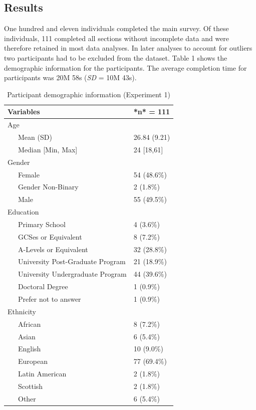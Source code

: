 \documentclass[
  donotrepeattitle,doc, 12pt, a4paper,floatsintext]{apa7}
\begin{document}
\hypertarget{results-1}{%
\subsection{Results}\label{results-1}}

One hundred and eleven individuals completed the main survey. Of these individuals, 111 completed all sections without incomplete data and were therefore retained in most data analyses. In later analyses to account for outliers two participants had to be excluded from the dataset. Table 1 shows the demographic information for the participants. The average completion time for participants was 20M 58s (\emph{SD} = 10M 43s).

\begin{table}[tbp]

\begin{center}
\begin{threeparttable}

\caption{\label{tab:unnamed-chunk-8}Participant demographic information (Experiment 1)}

\small{

\begin{tabular}{ll}
\toprule
Variables & *n* = 111\\
\midrule
Age & \\
\ \ \ Mean (SD) & 26.84 (9.21)\\
\ \ \ Median [Min, Max] & 24 [18,61]\\
Gender & \\
\ \ \ Female & 54 (48.6\%)\\
\ \ \ Gender Non-Binary & 2 (1.8\%)\\
\ \ \ Male & 55 (49.5\%)\\
Education & \\
\ \ \ Primary School & 4 (3.6\%)\\
\ \ \ GCSes or Equivalent & 8 (7.2\%)\\
\ \ \ A-Levels or Equivalent & 32 (28.8\%)\\
\ \ \ University Post-Graduate Program & 21 (18.9\%)\\
\ \ \ University Undergraduate Program & 44 (39.6\%)\\
\ \ \ Doctoral Degree & 1 (0.9\%)\\
\ \ \ Prefer not to answer & 1 (0.9\%)\\
Ethnicity & \\
\ \ \ African & 8 (7.2\%)\\
\ \ \ Asian & 6 (5.4\%)\\
\ \ \ English & 10 (9.0\%)\\
\ \ \ European & 77 (69.4\%)\\
\ \ \ Latin American & 2 (1.8\%)\\
\ \ \ Scottish & 2 (1.8\%)\\
\ \ \ Other & 6 (5.4\%)\\
\bottomrule
\end{tabular}

}

\end{threeparttable}
\end{center}

\end{table}
\end{document}
